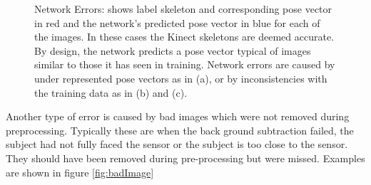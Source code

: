 \documentclass[11pt]{article} %
\begin{document}
\begin{figure}
\qquad%
%
\caption{Network Errors: shows label skeleton and corresponding pose vector in red and the network's predicted pose vector in blue for each of the images. In these cases the Kinect skeletons are deemed accurate. By design, the network predicts a pose vector typical of images similar to those it has seen in training. Network errors are caused by under represented pose vectors as in (a), or by inconsistencies with the training data as in (b) and (c).}
\label{fig:netErrs}
\end{figure}

Another type of error is caused by bad images which were not removed during preprocessing. Typically these are when the back ground subtraction failed, the subject had not fully faced the sensor or the subject is too close to the sensor. They should have been removed during pre-processing but were missed. Examples are shown in figure \ref{fig:badImage}
\end{document}
